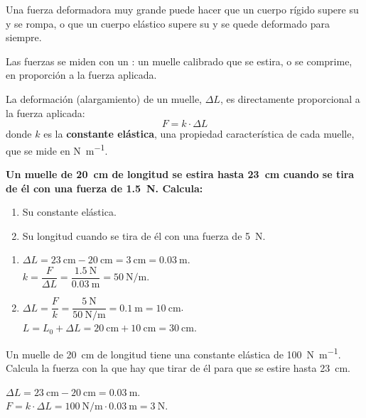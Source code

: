 \begin{impt}
    Una fuerza deformadora muy grande puede hacer que un cuerpo rígido supere su  y se rompa, o que un cuerpo elástico supere su  y se quede deformado para siempre.
\end{impt}

Las fuerzas se miden con un : un muelle calibrado que se estira, o se comprime, en proporción a la fuerza aplicada.

\begin{definition}
    La deformación (alargamiento) de un muelle, \(\Delta L\), es directamente proporcional a la fuerza aplicada:
    \begin{equation*}
        F = k \cdot \Delta L
    \end{equation*}
    donde \(k\) es la \textbf{constante elástica}, una propiedad característica de cada muelle, que se mide en \unit{\newton\per\metre}.
\end{definition}

\begin{example}
    \textbf{Un muelle de \qty{20}{\cm} de longitud se estira hasta \qty{23}{\cm} cuando se tira de él con una fuerza de \qty{1.5}{\newton}. Calcula:}
    \begin{enumerate}[label=\letraminuscula]
        \item Su constante elástica.
        \item Su longitud cuando se tira de él con una fuerza de \qty{5}{\newton}.
    \end{enumerate}
    \begin{enumerate}[label=\alph*)]
        \item \(\Delta L = \qty{23}{\cm} - \qty{20}{\cm} = \qty{3}{\cm} = \qty{0.03}{\m}\). \\
        \(k = \dfrac{F}{\Delta L} = \dfrac{\qty{1.5}{\newton}}{\qty{0.03}{\m}} = \qty{50}{\newton\per\metre}\).
        \item \(\Delta L = \dfrac{F}{k} = \dfrac{\qty{5}{\newton}}{\qty{50}{\newton\per\metre}} = \qty{0.1}{\m} = \qty{10}{\cm}\). \\
        \(L = L_0 + \Delta L = \qty{20}{\cm} + \qty{10}{\cm} = \qty{30}{\cm}\).
    \end{enumerate}
\end{example}

\begin{exercise}
    Un muelle de \qty{20}{\cm} de longitud tiene una constante elástica de \qty{100}{\newton\per\metre}. Calcula la fuerza con la que hay que tirar de él para que se estire hasta \qty{23}{\cm}.
    \begin{solu}
        \(\Delta L = \qty{23}{\cm} - \qty{20}{\cm} = \qty{0.03}{\m}\). \\
        \(F = k \cdot \Delta L = \qty{100}{\newton\per\metre} \cdot \qty{0.03}{\m} = \qty{3}{\newton}\).
    \end{solu}
\end{exercise}

